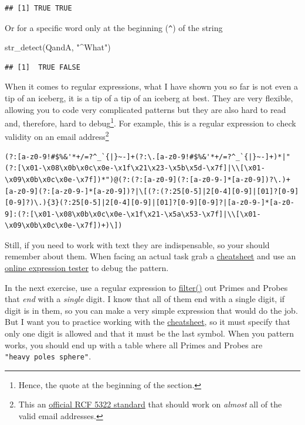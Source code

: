 \documentclass[
]{book}
\newenvironment{Shaded}{\begin{snugshade}}{\end{snugshade}}
\newcommand{\FunctionTok}[1]{\textcolor[rgb]{0.00,0.00,0.00}{#1}}
\newcommand{\NormalTok}[1]{#1}
\newcommand{\StringTok}[1]{\textcolor[rgb]{0.31,0.60,0.02}{#1}}
\begin{document}
\begin{verbatim}
## [1] TRUE TRUE
\end{verbatim}

Or for a specific word only at the beginning (\texttt{\^{}}) of the string

\begin{Shaded}
\begin{Highlighting}[]
\FunctionTok{str\_detect}\NormalTok{(QandA, }\StringTok{"\^{}What"}\NormalTok{)}
\end{Highlighting}
\end{Shaded}

\begin{verbatim}
## [1]  TRUE FALSE
\end{verbatim}

When it comes to regular expressions, what I have shown you so far is not even a tip of an iceberg, it is a tip of a tip of an iceberg at best. They are very flexible, allowing you to code very complicated patterns but they are also hard to read and, therefore, hard to debug\footnote{Hence, the quote at the beginning of the section.}. For example, this is a regular expression to check validity on an email address\footnote{This an \href{https://emailregex.com/}{official RCF 5322 standard} that should work on \emph{almost} all of the valid email addresses.}

\begin{verbatim}
(?:[a-z0-9!#$%&'*+/=?^_`{|}~-]+(?:\.[a-z0-9!#$%&'*+/=?^_`{|}~-]+)*|"(?:[\x01-\x08\x0b\x0c\x0e-\x1f\x21\x23-\x5b\x5d-\x7f]|\\[\x01-\x09\x0b\x0c\x0e-\x7f])*")@(?:(?:[a-z0-9](?:[a-z0-9-]*[a-z0-9])?\.)+[a-z0-9](?:[a-z0-9-]*[a-z0-9])?|\[(?:(?:25[0-5]|2[0-4][0-9]|[01]?[0-9][0-9]?)\.){3}(?:25[0-5]|2[0-4][0-9]|[01]?[0-9][0-9]?|[a-z0-9-]*[a-z0-9]:(?:[\x01-\x08\x0b\x0c\x0e-\x1f\x21-\x5a\x53-\x7f]|\\[\x01-\x09\x0b\x0c\x0e-\x7f])+)\])
\end{verbatim}

Still, if you need to work with text they are indispensable, so your should remember about them. When facing an actual task grab a \href{https://raw.githubusercontent.com/rstudio/cheatsheets/main/strings.pdf}{cheatsheet} and use an \href{https://spannbaueradam.shinyapps.io/r_regex_tester/}{online expression tester} to debug the pattern.

In the next exercise, use a regular expression to \href{https://dplyr.tidyverse.org/reference/filter.html}{filter()} out Primes and Probes that \emph{end} with a \emph{single} digit. I know that all of them end with a single digit, if digit is in them, so you can make a very simple expression that would do the job. But I want you to practice working with the \href{https://raw.githubusercontent.com/rstudio/cheatsheets/main/strings.pdf}{cheatsheet}, so it must specify that only one digit is allowed and that it must be the last symbol. When you pattern works, you should end up with a table where all Primes and Probes are \texttt{"heavy\ poles\ sphere"}.
\end{document}
